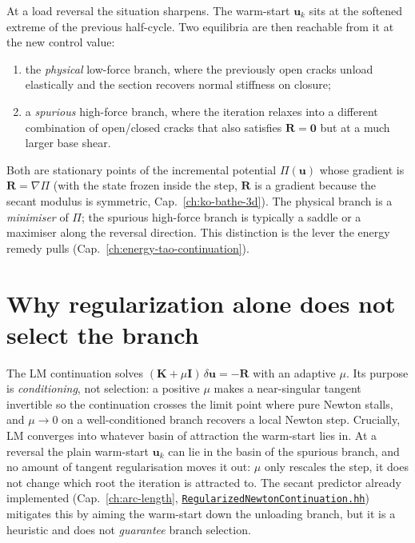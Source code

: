 At a load reversal the situation sharpens. The warm-start
\(\mathbf{u}_k\) sits at the softened extreme of the previous half-cycle.
Two equilibria are then reachable from it at the new control value:
%
\begin{enumerate}
  \item the \emph{physical} low-force branch, where the previously open
        cracks unload elastically and the section recovers normal
        stiffness on closure;
  \item a \emph{spurious} high-force branch, where the iteration relaxes
        into a different combination of open/closed cracks that also
        satisfies \(\mathbf{R}=\mathbf{0}\) but at a much larger base
        shear.
\end{enumerate}
%
Both are stationary points of the incremental potential
\(\Pi(\mathbf{u})\) whose gradient is \(\mathbf{R}=\nabla\Pi\) (with the
state frozen inside the step, \(\mathbf{R}\) is a gradient because the
secant modulus is symmetric, Cap.~\ref{ch:ko-bathe-3d}). The
physical branch is a \emph{minimiser} of \(\Pi\); the spurious high-force
branch is typically a saddle or a maximiser along the reversal
direction. This distinction is the lever the energy remedy pulls
(Cap.~\ref{ch:energy-tao-continuation}).

\section{Why regularization alone does not select the branch}

The LM continuation \cite{Levenberg1944,Marquardt1963} solves
\((\mathbf{K}+\mu\mathbf{I})\,\delta\mathbf{u}=-\mathbf{R}\) with an
adaptive \(\mu\). Its purpose is \emph{conditioning}, not selection: a
positive \(\mu\) makes a near-singular tangent invertible so the
continuation crosses the limit point where pure Newton stalls, and
\(\mu\!\to\!0\) on a well-conditioned branch recovers a local Newton
step. Crucially, LM converges into whatever basin of attraction the
warm-start lies in. At a reversal the plain warm-start \(\mathbf{u}_k\)
can lie in the basin of the spurious branch, and no amount of tangent
regularisation moves it out: \(\mu\) only rescales the step, it does not
change which root the iteration is attracted to. The secant predictor
already implemented (Cap.~\ref{ch:arc-length},
\href{run:src/analysis/RegularizedNewtonContinuation.hh}{%
\texttt{RegularizedNewtonContinuation.hh}}) mitigates this by aiming the
warm-start down the unloading branch, but it is a heuristic and does not
\emph{guarantee} branch selection.

